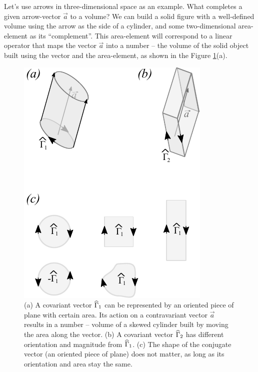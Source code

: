 Let's use arrows in three-dimensional space as an example. What
completes a given arrow-vector $\vec{a}$ to a volume?
We can build a
solid figure with a well-defined volume using the arrow as the side of
a cylinder,
and some two-dimensional area-element as its ``complement''.  This
area-element will correspond to a linear operator that maps the vector
$\vec{a}$ into a number -- the volume of the solid object built using
the vector and the area-element, as shown in the Figure
\ref{fig:conjugateVectorMeaning}(a).
\begin{figure}[htbp]
  \centering
  \includegraphics[scale=1.0]{conjugateVectorMeaning}
  \caption{(a) A covariant vector $\widehat{\Gamma}_1$ can be represented
    by an oriented piece of plane with certain area. Its action on a
    contravariant vector $\vec{a}$ results in a number -- volume of a
    skewed cylinder built by moving the area along the vector. (b) A
    covariant vector $\widehat{\Gamma}_2$ has different orientation and
    magnitude from $\widehat{\Gamma}_1$. (c) The shape of the conjugate
    vector (an oriented piece of plane) does not
    matter, as long as its orientation and area stay the same.}
  \label{fig:conjugateVectorMeaning}
\end{figure}

